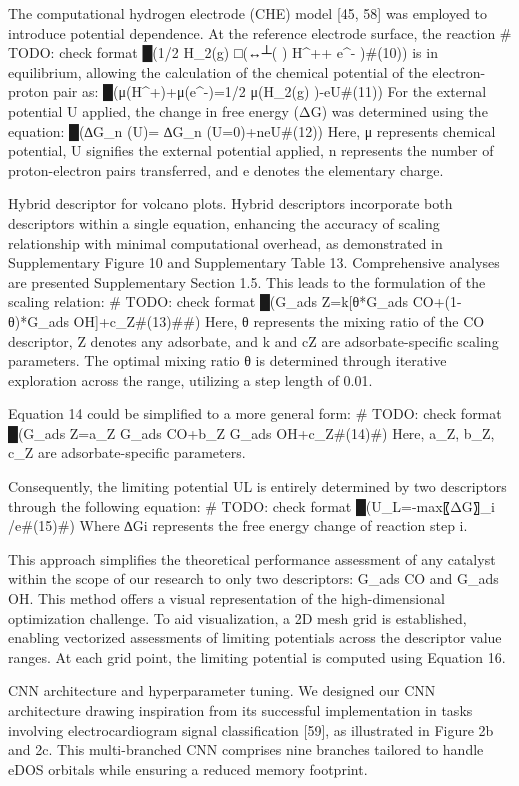 The computational hydrogen electrode (CHE) model [45, 58] was employed to introduce potential dependence. At the reference electrode surface, the reaction
# TODO: check format
█(1/2 H_2(g)   □(↔┴(           )  H^++ e^- )#(10))
is in equilibrium, allowing the calculation of the chemical potential of the electron-proton pair as:
█(μ(H^+)+μ(e^-)=1/2 μ(H_2(g) )-eU#(11))
For the external potential U applied, the change in free energy (ΔG) was determined using the equation:
█(∆G_n (U)= ∆G_n (U=0)+neU#(12))
Here, μ represents chemical potential, U signifies the external potential applied, n represents the number of proton-electron pairs transferred, and e denotes the elementary charge.


Hybrid descriptor for volcano plots.
Hybrid descriptors incorporate both descriptors within a single equation, enhancing the accuracy of scaling relationship with minimal computational overhead, as demonstrated in Supplementary Figure 10 and Supplementary Table 13. Comprehensive analyses are presented Supplementary Section 1.5. This leads to the formulation of the scaling relation:
# TODO: check format
█(G_ads Z=k[θ*G_ads CO+(1-θ)*G_ads OH]+c_Z#(13)##)
Here, θ represents the mixing ratio of the CO descriptor, Z denotes any adsorbate, and k and cZ are adsorbate-specific scaling parameters. The optimal mixing ratio θ is determined through iterative exploration across the range, utilizing a step length of 0.01.

Equation 14 could be simplified to a more general form:
# TODO: check format
█(G_ads Z=a_Z G_ads CO+b_Z G_ads OH+c_Z#(14)#)
Here, a_Z, b_Z, c_Z are adsorbate-specific parameters.

Consequently, the limiting potential UL is entirely determined by two descriptors through the following equation:
# TODO: check format
█(U_L=-max⁡{〖ΔG〗_i }/e#(15)#)
Where ∆Gi represents the free energy change of reaction step i.

This approach simplifies the theoretical performance assessment of any catalyst within the scope of our research to only two descriptors: G_ads CO and G_ads OH. This method offers a visual representation of the high-dimensional optimization challenge. To aid visualization, a 2D mesh grid is established, enabling vectorized assessments of limiting potentials across the descriptor value ranges. At each grid point, the limiting potential is computed using Equation 16.


CNN architecture and hyperparameter tuning.
We designed our CNN architecture drawing inspiration from its successful implementation in tasks involving electrocardiogram signal classification [59], as illustrated in Figure 2b and 2c. This multi-branched CNN comprises nine branches tailored to handle eDOS orbitals while ensuring a reduced memory footprint.

